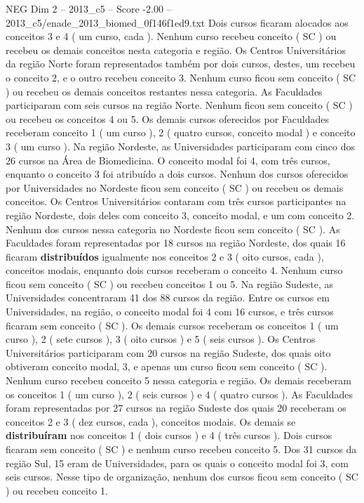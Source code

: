 \begin{textsample}{NEG Dim 2 – 2013\_c5 – Score -2.00 – 2013\_c5/enade\_2013\_biomed\_0f146f1ed9.txt}
Dois cursos ficaram alocados aos conceitos 3 e 4 ( um curso, cada ).
Nenhum curso recebeu conceito ( SC ) ou recebeu os demais conceitos nesta categoria e região.
Os Centros Universitários da região Norte foram representados também por dois cursos, destes, um recebeu o conceito 2, e o outro recebeu conceito 3.
Nenhum curso ficou sem conceito ( SC ) ou recebeu os demais conceitos restantes nessa categoria.
As Faculdades participaram com seis cursos na região Norte.
Nenhum ficou sem conceito ( SC ) ou recebeu os conceitos 4 ou 5.
Os demais cursos oferecidos por Faculdades receberam conceito 1 ( um curso ), 2 ( quatro cursos, conceito modal ) e conceito 3 ( um curso ).
Na região Nordeste, as Universidades participaram com cinco dos 26 cursos na Área de Biomedicina.
O conceito modal foi 4, com três cursos, enquanto o conceito 3 foi atribuído a dois cursos.
Nenhum dos cursos oferecidos por Universidades no Nordeste ficou sem conceito ( SC ) ou recebeu os demais conceitos.
Os Centros Universitários contaram com três cursos participantes na região Nordeste, dois deles com conceito 3, conceito modal, e um com conceito 2.
Nenhum dos cursos nessa categoria no Nordeste ficou sem conceito ( SC ).
As Faculdades foram representadas por 18 cursos na região Nordeste, dos quais 16 ficaram \textbf{distribuídos} igualmente nos conceitos 2 e 3 ( oito cursos, cada ), conceitos modais, enquanto dois cursos receberam o conceito 4.
Nenhum curso ficou sem conceito ( SC ) ou recebeu conceitos 1 ou 5.
Na região Sudeste, as Universidades concentraram 41 dos 88 cursos da região.
Entre os cursos em Universidades, na região, o conceito modal foi 4 com 16 cursos, e três cursos ficaram sem conceito ( SC ).
Os demais cursos receberam os conceitos 1 ( um curso ), 2 ( sete cursos ), 3 ( oito cursos ) e 5 ( seis cursos ).
Os Centros Universitários participaram com 20 cursos na região Sudeste, dos quais oito obtiveram conceito modal, 3, e apenas um curso ficou sem conceito ( SC ).
Nenhum curso recebeu conceito 5 nessa categoria e região.
Os demais receberam os conceitos 1 ( um curso ), 2 ( seis cursos ) e 4 ( quatro cursos ).
As Faculdades foram representadas por 27 cursos na região Sudeste dos quais 20 receberam os conceitos 2 e 3 ( dez cursos, cada ), conceitos modais.
Os demais se \textbf{distribuíram} nos conceitos 1 ( dois cursos ) e 4 ( três cursos ).
Dois cursos ficaram sem conceito ( SC ) e nenhum curso recebeu conceito 5.
Dos 31 cursos da região Sul, 15 eram de Universidades, para os quais o conceito modal foi 3, com seis cursos.
Nesse tipo de organização, nenhum dos cursos ficou sem conceito ( SC ) ou recebeu conceito 1.

\end{textsample}
